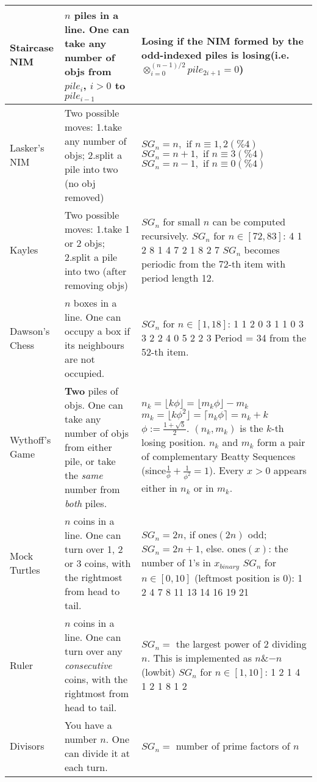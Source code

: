 \documentclass[landscape,a4paper,twocolumn,10pt]{report}
\begin{document}
\begin{xtabular}{p{1.5cm}|p{4cm}|p{7cm}}
Staircase NIM &
$n$ piles in a line. One can take any number of objs from $pile_i$, $i>0$ to $pile_{i-1}$ &
Losing if the NIM formed by the odd-indexed piles is losing(i.e. $\otimes_{i=0}^{(n-1)/2} pile_{2i+1}=0$)
\\ \hline

Lasker's NIM &
Two possible moves: 1.take any number of objs; 2.split a pile into two (no obj removed) &
$SG_n = n, \text{ if }n\equiv 1,2(\% 4)$ $SG_n = n+1, \text{ if }n\equiv3(\% 4)$ $SG_n = n-1, \text{ if }n\equiv0(\% 4)$
\\ \hline

Kayles &
Two possible moves: 1.take 1 or 2 objs; 2.split a pile into two (after removing objs) &
$SG_n$ for small $n$ can be computed recursively. $SG_n$ for $n \in [72,83]$: 4 1 2 8 1 4 7 2 1 8 2 7
$SG_n$ becomes periodic from the 72-th item with period length 12.
\\ \hline

Dawson's Chess &
$n$ boxes in a line. One can occupy a box if its neighbours are not occupied. &
$SG_n$ for $n\in [1,18]$: 1 1 2 0 3 1 1 0 3 3 2 2 4 0 5 2 2 3
Period = 34 from the 52-th item.
\\ \hline

Wythoff's Game
& \textbf{Two} piles of objs. One can take any number of objs from either pile, or take the \emph{same} number from \emph{both} piles. &
$n_k = \lfloor k \phi \rfloor = \lfloor m_k \phi \rfloor -m_k$  $m_k = \lfloor k \phi^2 \rfloor = \lceil n_k \phi \rceil = n_k + k$  $\phi:=\frac{1+\sqrt{5}}{2}$. $(n_k,m_k)$ is the $k$-th losing position.
$n_k$ and $m_k$ form a pair of complementary Beatty Sequences (since$\frac{1}{\phi}+\frac{1}{\phi^2}=1$). Every $x>0$ appears either in $n_k$ or in $m_k$.
\\ \hline

Mock Turtles &
$n$ coins in a line. One can turn over 1, 2 or 3 coins, with the rightmost from head to tail. &
$SG_n = 2n$, if $\mathrm{ones}(2n)$ odd; $SG_n = 2n + 1$, else. $\mathrm{ones}(x)$: the number of 1's in $x_{binary}$
$SG_n$ for $n\in [0,10]$ (leftmost position is 0): 1 2 4 7 8 11 13 14 16 19 21
\\ \hline

Ruler &
$n$ coins in a line. One can turn over any \emph{consecutive} coins, with the rightmost from head to tail. &
$SG_n=$ the largest power of 2 dividing $n$. This is implemented as $n$\&$-n$(lowbit)
$SG_n$ for $n\in [1,10]$: 1 2 1 4 1 2 1 8 1 2
\\ \hline

Divisors &
You have a number $n$. One can divide it at each turn. &
$SG_n=$ number of prime factors of $n$
\\ \hline

\end{xtabular}
\end{document}
